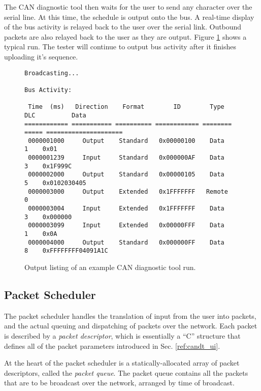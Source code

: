 The CAN diagnostic tool then waits for the user to send any character over the serial line. At this time, the schedule is output onto the bus. A real-time display of the bus activity is relayed back to the user over the serial link. Outbound packets are also relayed back to the user as they are output. Figure \ref{fig:candt_output} shows a typical run. The tester will continue to output bus activity after it finishes uploading it's sequence. 

\begin{figure}[H]
	\centering
	\makebox[\textwidth]{\hrulefill}
{\footnotesize	
	\begin{verbatim}
Broadcasting...

Bus Activity:

 Time  (ms)   Direction    Format        ID        Type    DLC          Data                  
============ =========== ========== ============ ======== ===== =====================
 0000001000     Output    Standard   0x00000100    Data     1    0x01 
 0000001239     Input     Standard   0x000000AF    Data     3    0x1F999C  
 0000002000     Output    Standard   0x00000105    Data     5    0x0102030405
 0000003000     Output    Extended   0x1FFFFFFF   Remote    0    
 0000003004     Input     Extended   0x1FFFFFFF    Data     3    0x000000
 0000003099     Input     Extended   0x00000FFF    Data     1    0x0A 
 0000004000     Output    Standard   0x000000FF    Data     8    0xFFFFFFFF04091A1C    
	\end{verbatim}
}	
	\makebox[\textwidth]{\hrulefill}
	\caption{Output listing of an example CAN diagnostic tool run.}
	\label{fig:candt_output}
\end{figure}
 
\subsection{Packet Scheduler}

The packet scheduler handles the translation of input from the user into packets, and the actual queuing and dispatching of packets over the network. Each packet is described by a \emph{packet descriptor}, which is essentially a ``C'' structure that defines all of the packet parameters introduced in Sec. \ref{ref:candt_ui}. 

At the heart of the packet scheduler is a statically-allocated array of packet descriptors, called the \emph{packet queue}. The packet queue contains all the packets that are to be broadcast over the network, arranged by time of broadcast.

